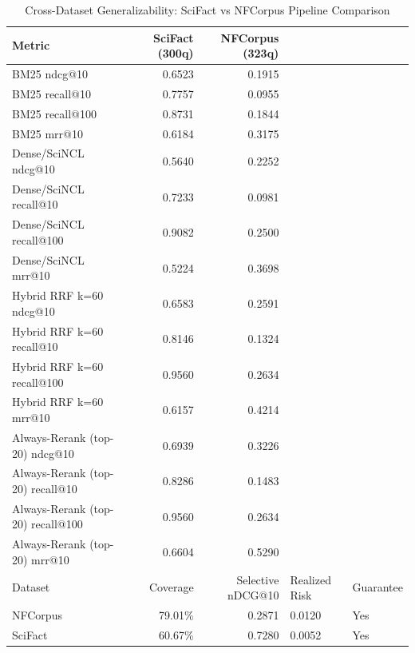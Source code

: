 \begin{table}[H]
\centering
\caption{Cross-Dataset Generalizability: SciFact vs NFCorpus Pipeline Comparison}
\label{tab:val_cross_dataset}
\begin{tabular}{lrr}
\toprule
Metric & SciFact (300q) & NFCorpus (323q) \\
\midrule
BM25 ndcg@10 & 0.6523 & 0.1915 \\
BM25 recall@10 & 0.7757 & 0.0955 \\
BM25 recall@100 & 0.8731 & 0.1844 \\
BM25 mrr@10 & 0.6184 & 0.3175 \\
Dense/SciNCL ndcg@10 & 0.5640 & 0.2252 \\
Dense/SciNCL recall@10 & 0.7233 & 0.0981 \\
Dense/SciNCL recall@100 & 0.9082 & 0.2500 \\
Dense/SciNCL mrr@10 & 0.5224 & 0.3698 \\
Hybrid RRF k=60 ndcg@10 & 0.6583 & 0.2591 \\
Hybrid RRF k=60 recall@10 & 0.8146 & 0.1324 \\
Hybrid RRF k=60 recall@100 & 0.9560 & 0.2634 \\
Hybrid RRF k=60 mrr@10 & 0.6157 & 0.4214 \\
Always-Rerank (top-20) ndcg@10 & 0.6939 & 0.3226 \\
Always-Rerank (top-20) recall@10 & 0.8286 & 0.1483 \\
Always-Rerank (top-20) recall@100 & 0.9560 & 0.2634 \\
Always-Rerank (top-20) mrr@10 & 0.6604 & 0.5290 \\
Dataset & Coverage & Selective nDCG@10 & Realized Risk & Guarantee \\
NFCorpus & 79.01\% & 0.2871 & 0.0120 & Yes \\
SciFact & 60.67\% & 0.7280 & 0.0052 & Yes \\
\bottomrule
\end{tabular}
\end{table}
